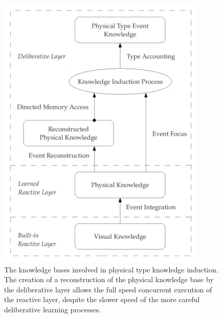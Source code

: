 \begin{figure}
\begin{center}
\includegraphics[width=10cm]{gfx/physical_type_knowledge_induction}
\end{center}
\caption[The knowledge bases involved in physical type knowledge
  induction.]{The knowledge bases involved in physical type knowledge
  induction.  The creation of a reconstruction of the physical
  knowledge base by the deliberative layer allows the full speed
  concurrent execution of the reactive layer, despite the slower speed
  of the more careful deliberative learning processes.}
\label{figure:physical_type_knowledge_induction}
\end{figure}

